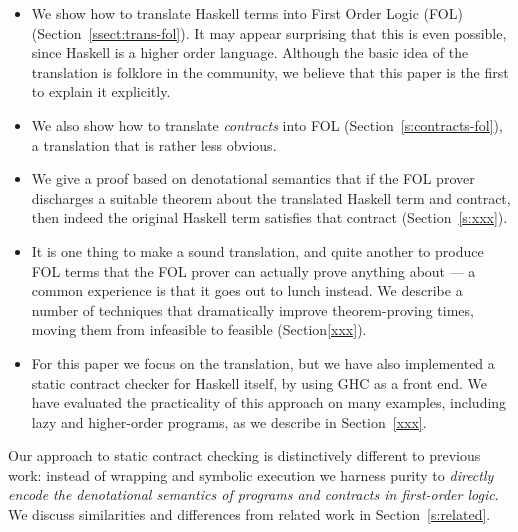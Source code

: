 \begin{itemize}
\item We show how to translate Haskell terms
into First Order Logic (FOL) (Section~\ref{ssect:trans-fol}).  
It may appear surprising that this 
is even possible, since Haskell is a higher order language.  Although
the basic idea of the translation is folklore in the community,
we believe that this paper is the first to explain it explicitly.

\item We also show how to translate \emph{contracts} into FOL
      (Section~\ref{s:contracts-fol}), 
      a translation that is rather less obvious.

\item We give a proof based on denotational semantics 
that if the FOL prover discharges a 
suitable theorem about the translated Haskell term and contract, 
then indeed the original Haskell term satisfies that contract (Section~\ref{s:xxx}).

\item It is one thing to make a sound translation, and quite another
to produce FOL terms that the FOL prover can actually prove anything
about --- a common experience is that it goes out to lunch instead.  We
describe a number of techniques that dramatically improve
theorem-proving times, moving them from infeasible to feasible (Section\ref{xxx}).

\item For this paper we focus on the
translation, but we have also implemented a static contract checker
for Haskell itself, by using GHC as a front end.  We have evaluated
the practicality of this approach on many examples, including lazy and
higher-order programs, as we describe in Section~\ref{xxx}.  
\end{itemize}
Our approach to static contract checking is distinctively different to
previous work: instead of wrapping and symbolic execution we harness
purity to \emph{directly encode the denotational semantics of programs
and contracts in first-order logic}.  We discuss similarities and differences from
related work in Section~\ref{s:related}.


















